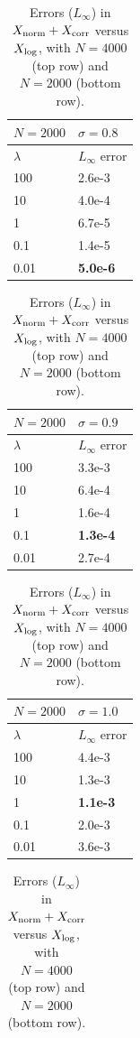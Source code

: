 \documentclass[letterpaper]{article}
\newcommand\T{\rule{0pt}{2.6ex}}       %
\newcommand\B{\rule[-1.2ex]{0pt}{0pt}} %
\begin{document}
\begin{table}[t]
\caption{Errors ($L_\infty$) in $X_{\rm norm}+X_{\rm corr}$ versus $X_{\rm
log}$, with $N=4000$ (top row) and $N=2000$ (bottom row).}
\label{tab:xcorr}
\vskip 0.15in
\begin{center}
\begin{small}
\begin{tabular}{l l}
\hline
\T\B  $N=2000$ & $\sigma=0.8$ \rule{0pt}{3ex} \\
\hline
\T\B $\lambda$ & $L_{\infty}$ error \\
\hline
100    & 2.6e-3 \T \\
10     & 4.0e-4  \\
1      & 6.7e-5  \\
0.1    & 1.4e-5  \\
0.01   & \textbf{5.0e-6} \B \\
\hline
\end{tabular}
\quad %
\begin{tabular}{l l}
\hline
\T\B $N=2000$ & $\sigma=0.9$ \\
\hline
\T\B $\lambda$ & $L_{\infty}$ error \\
\hline
100    & 3.3e-3 \T \\
10     & 6.4e-4  \\
1      & 1.6e-4  \\
0.1    & \textbf{1.3e-4}  \\
0.01   & 2.7e-4 \B \\
\hline
\end{tabular}
\quad %
\begin{tabular}{l l}
\hline
\T\B $N=2000$ & $\sigma=1.0$ \\
\hline
\T\B $\lambda$ & $L_{\infty}$ error \\
\hline
100    & 4.4e-3 \T \\
10     & 1.3e-3  \\
1      & \textbf{1.1e-3}  \\
0.1    & 2.0e-3  \\
0.01   & 3.6e-3 \B \\
\hline
\end{tabular}
\quad %
\begin{tabular}{l l}

\end{tabular}
\end{small}
\end{center}
\end{table}
\end{document}
